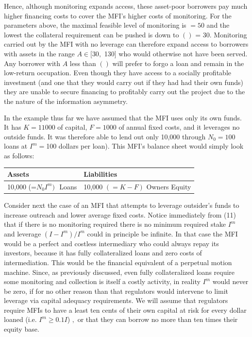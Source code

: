 \documentclass[letterpaper, 12pt]{article}
\begin{document}
Hence, although monitoring expands access, these asset-poor borrowers
pay much higher financing costs to cover the MFI's higher costs of
monitoring. For the parameters above, the maximal feasible level of
monitoring is \(= 50\) and the lowest the collateral requirement can be
pushed is down to \(()\) = 30. Monitoring carried out by the MFI with no
leverage can therefore expand access to borrowers with assets in the
range \(A \in \lbrack\)30\(,\) 130\(\rbrack\) who would otherwise not
have been served. Any borrower with \(A\) less than \(()\) will prefer
to forgo a loan and remain in the low-return occupation. Even though
they have access to a socially profitable investment (and one that they
would carry out if they had had their own funds) they are unable to
secure financing to profitably carry out the project due to the the
nature of the information asymmetry.

In the example thus far we have assumed that the MFI uses only its own
funds. It has \(K = 11000\) of capital, \(F = 1000\) of annual fixed
costs, and it leverages no outside funds. It was therefore able to lend
out only 10,000 through \(N_{0} = 100\) loans at \(I^{m} =\)100 dollars
per loan). This MFI's balance sheet would simply look as follows:

\begin{longtable}[]{@{}ll@{}}
\toprule
\textbf{Assets} & \textbf{Liabilities}\tabularnewline
\midrule
\endhead
10,000 (=\(N_{0}I^{m})\mspace{6mu}\) Loans & 10,000 \(( = K - F)\)
Owners Equity\tabularnewline
\bottomrule
\end{longtable}

Consider next the case of an MFI that attempts to leverage outsider's
funds to increase outreach and lower average fixed costs. Notice
immediately from (11) that if there is no monitoring required there is
no minimum required stake \(I^{m}\) and leverage \((I - I^{m})/I^{m}\)
could in principle be infinite. In that case the MFI would be a perfect
and costless intermediary who could always repay its investors, because
it has fully collateralized loans and zero costs of intermediation. This
would be the financial equivalent of a perpetual motion machine. Since,
as previously discussed, even fully collateralized loans require some
monitoring and collection is itself a costly activity, in reality
\(I^{m}\) would never be zero, if for no other reason than that
regulators would intervene to limit leverage via capital adequacy
requirements. We will assume that regulators require MFIs to have a
least ten cents of their own capital at risk for every dollar loaned
(i.e. \(I^{m} \geq 0.1I\)) \(,\) or that they can borrow no more than
ten times their equity base.
\end{document}
